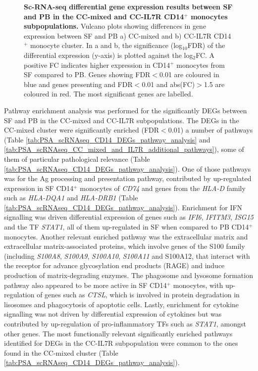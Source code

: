 \begin{figure}[H]
\begin{subfigure}[b]{0.55\textwidth}
\caption{}
\end{subfigure}
\caption[Sc-RNA-seq differential gene expression results between SF and PB in the CC-mixed and CC-IL7R CD14$^+$ monocytes subpopulations.]{\textbf{Sc-RNA-seq differential gene expression results between SF and PB in the CC-mixed and CC-IL7R CD14$^+$ monocytes subpopulations.} Vulcano plots showing differences in gene expression between SF and PB a) CC-mixed and b) CC-IL7R CD14$^+$ monocyte cluster. In a and b, the significance (log${_10}$FDR) of the differential expression (y-axis) is plotted against the log${_2}$FC. A positive FC indicates higher expression in CD14$^+$ monocytes from SF compared to PB. Genes showing FDR$<$0.01 are coloured in blue and genes presenting and FDR$<$0.01 and abs(FC)$>$1.5 are coloured in red. The most significant genes are labelled.}
\label{figure:PsA_scRNAseq_vulcano_plots_mixed_and_IL7R_clusters}
\end{figure}

Pathway enrichment analysis was performed for the significantly DEGs between SF and PB in the CC-mixed and CC-IL7R subpopulations. The DEGs in the CC-mixed cluster were significantly enriched (FDR$<$0.01) a number of pathways (Table \ref{tab:PSA_scRNAseq_CD14_DEGs_pathway_analysis} and \ref{tab:PSA_scRNAseq_CC_mixed_and_IL7R_additional_pathways}), some of them of particular pathological relevance (Table \ref{tab:PSA_scRNAseq_CD14_DEGs_pathway_analysis}). One of those pathways was for the Ag processing and presentation pathway, contributed by up-regulated expression in SF CD14$^+$ monocytes of \textit{CD74} and genes from the \textit{HLA-D} family such as \textit{HLA-DQA1} and \textit{HLA-DRB1} (Table \ref{tab:PSA_scRNAseq_CD14_DEGs_pathway_analysis}). Enrichment for IFN signalling was driven differential expression of genes such as \textit{IFI6}, \textit{IFITM3}, \textit{ISG15} and the TF \textit{STAT1}, all of them up-regulated in SF when compared to PB CD14$^+$ monocytes. Another relevant enriched pathway was the extracellular matrix and extracellular matrix-associated proteins, which involve genes of the S100 family (including \textit{S100A8}, \textit{S100A9}, \textit{S100A10}, \textit{S100A11} and S100A12, that interact with the receptor for advance glycosylation end products (RAGE) and induce production of matrix-degrading enzymes. The phagosome and lysosome formation pathway also appeared to be more active in SF CD14$^+$ monocytes, with up-regulation of genes such as \textit{CTSL}, which is involved in protein degradation in lisosomes and phagocytosis of apoptotic cells. Lastly, enrichment for cytokine signalling was not driven by differential expression of cytokines but was contributed by up-regulation of pro-inflammatory TFs such as \textit{STAT1}, amongst other genes. The most functionally relevant significantly enriched pathways identified for DEGs in the CC-IL7R subpopulation were common to the ones found in the CC-mixed cluster (Table \ref{tab:PSA_scRNAseq_CD14_DEGs_pathway_analysis}).


